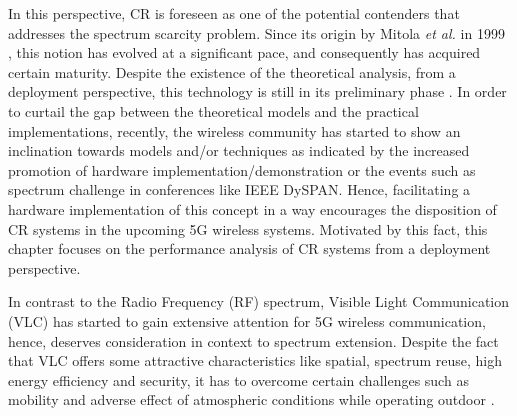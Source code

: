 In this perspective, CR is foreseen as one of the potential contenders that addresses the spectrum scarcity problem. Since its origin by Mitola \textit{et al.} in 1999 \cite{Mitola99}, this notion has evolved at a significant pace, and consequently has acquired certain maturity. Despite the existence of the theoretical analysis, from a deployment perspective, this technology is still in its preliminary phase \cite{Pawe11}. In order to curtail the gap between the theoretical models and the practical implementations, recently, the wireless community has started to show an inclination towards models and/or techniques as indicated by the increased promotion of hardware implementation/demonstration or the events such as spectrum challenge \cite{Kaushik15_D} in conferences like IEEE DySPAN. Hence, facilitating a hardware implementation of this concept in a way encourages the disposition of CR systems in the upcoming 5G wireless systems. Motivated by this fact, this chapter focuses on the performance analysis of CR systems from a deployment perspective.

In contrast to the Radio Frequency (RF) spectrum, Visible Light Communication (VLC)  has started to gain extensive attention for 5G wireless communication, hence, deserves consideration in context to spectrum extension. Despite the fact that VLC offers some attractive characteristics like spatial, spectrum reuse, high energy efficiency and security, it has to overcome certain challenges such as mobility and adverse effect of atmospheric conditions while operating outdoor \cite{Wu14}.


